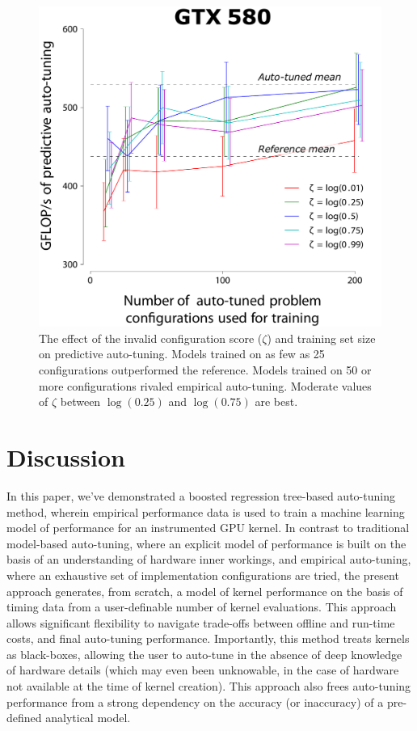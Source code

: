 \documentclass{sig-alternate}
\begin{document}
\begin{figure}[!t]
\centering
\includegraphics[width=\linewidth]{illustrator/fig_ntrain_munctional0_580.pdf} %
\caption{The effect of the invalid configuration score ($\zeta$) and training set
size on predictive auto-tuning.
Models trained on as few as 25 configurations outperformed the reference.
Models trained on 50 or more configurations rivaled empirical auto-tuning.
Moderate values of $\zeta$ between $\log(0.25)$ and $\log(0.75)$ are best.
}
\label{fig:fig_ntrain}
\end{figure}


\section{Discussion}
\label{sec:discuss}

In this paper, we've demonstrated a boosted regression tree-based auto-tuning
method, wherein empirical performance data is used to train a machine learning
model of performance for an instrumented GPU kernel.  In contrast to
traditional model-based auto-tuning, where an explicit model of performance is
built on the basis of an understanding of hardware inner workings, and
empirical auto-tuning, where an exhaustive set of implementation configurations
are tried, the present approach generates, from scratch, a model of kernel
performance on the basis of timing data from a user-definable number of kernel
evaluations.  This approach allows significant flexibility to navigate
trade-offs between offline and run-time costs, and final auto-tuning
performance.  Importantly, this method treats kernels as black-boxes, allowing
the user to auto-tune in the absence of deep knowledge of hardware details
(which may even been unknowable, in the case of hardware not available at the
time of kernel creation).  This approach also frees auto-tuning performance
from a strong dependency on the accuracy (or inaccuracy) of a pre-defined
analytical model.
\end{document}
